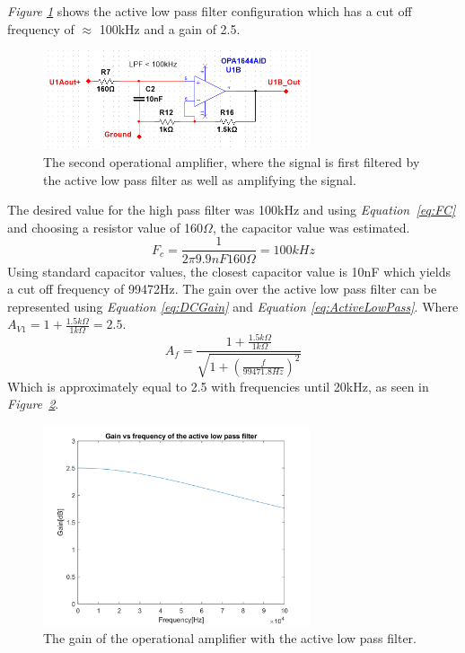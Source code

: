 \textit{Figure \ref{fig:Opamp2}} shows the active low pass filter configuration which has a cut off frequency of $\approx$ 100kHz and a gain of 2.5.

\begin{figure}[h]
    \centering
    \includegraphics[width=0.7\textwidth]{graphics/OPamp2.png}
    \caption{The second operational amplifier, where the signal is first filtered by the active low pass filter as well as amplifying the signal.}
    \label{fig:Opamp2}
\end{figure}

The desired value for the high pass filter was 100kHz and using \textit{Equation~\ref{eq:FC}} and choosing a resistor value of 160$\Omega$, the capacitor value was estimated.   
$$F_c = \frac{1}{2\pi 9.9nF 160\Omega} = 100kHz$$
Using standard capacitor values, the closest capacitor value is 10nF which yields a cut off frequency of 99472Hz.
The gain over the active low pass filter can be represented using \textit{Equation \ref{eq:DCGain}} and \textit{Equation \ref{eq:ActiveLowPass}}. 
Where $A_{V1} = 1 + \frac{1.5k\Omega}{1k\Omega} = 2.5$.
$$A_f  = \frac{1 + \frac{1.5k\Omega}{1k\Omega}}{\sqrt{1 + (\frac{f}{99471.8Hz})^2}}$$
Which is approximately equal to 2.5 with frequencies until 20kHz, as seen in 
\textit{Figure~\ref{fig:AVlowpass}}.
\\
\begin{figure}[h]
    \centering
    \includegraphics[width=0.7\textwidth]{graphics/Av_Lowpass.png}
    \caption{The gain of the operational amplifier with the active low pass filter.}
    \label{fig:AVlowpass}
\end{figure}

